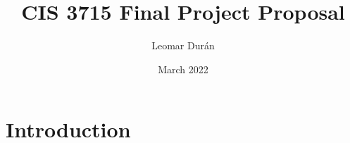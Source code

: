 \documentclass{article}
\title{CIS 3715 Final Project Proposal}
\author{Leomar Durán}
\date{March 2022}
\begin{document}
\maketitle

\section{Introduction}
\end{document}
